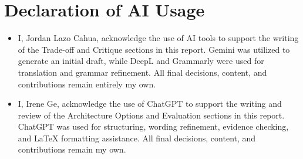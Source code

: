 \section*{Declaration of AI Usage}

\begin{itemize}
    \item I, Jordan Lazo Cahua, acknowledge the use of AI tools to support the writing of the Trade-off and Critique sections in this report. Gemini was utilized to generate an initial draft, while DeepL and Grammarly were used for translation and grammar refinement. All final decisions, content, and contributions remain entirely my own.
    \item I, Irene Ge, acknowledge the use of ChatGPT to support the writing and review of the Architecture Options and Evaluation sections in this report. ChatGPT was used for structuring, wording refinement, evidence checking, and LaTeX formatting assistance. All final decisions, content, and contributions remain my own.
\end{itemize}
